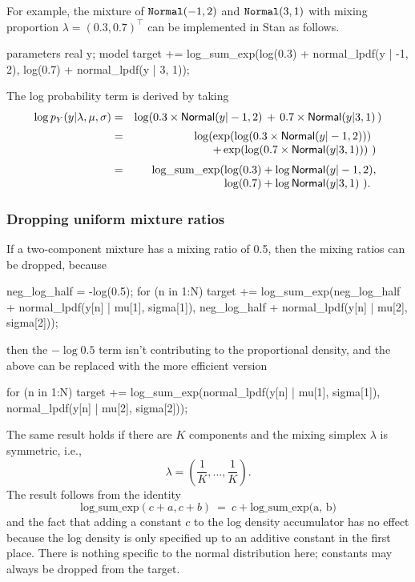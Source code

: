 For example, the mixture of ${\tt Normal}(-1,2)$ and
${\tt Normal}(3,1)$ with mixing proportion $\lambda =
(0.3,0.7)^{\top}$ can be implemented in Stan as follows.
%
\begin{stancode}
parameters {
  real y;
}
model {
  target += log_sum_exp(log(0.3) + normal_lpdf(y | -1, 2),
                        log(0.7) + normal_lpdf(y | 3, 1));
}
\end{stancode}
%
The log probability term is derived by taking
%
\begin{eqnarray*}
\log p_Y(y | \lambda,\mu,\sigma) & = & \log\!\left( 0.3 \times \mbox{\sf Normal}(y|-1,2) \, + \,
  0.7 \times
  \mbox{\sf Normal}(y|3,1) \, \right)
\\[2pt]
& = & \log(\hspace*{-5pt} \begin{array}[t]{l}
                 \exp(\log(0.3 \times \mbox{\sf Normal}(y|-1,2))) \\
                 + \exp(\log(0.7 \times \mbox{\sf Normal}(y|3,1))) \ )
              \end{array}
\\[2pt]
& = & \mbox{log\_sum\_exp}(\hspace*{-5pt}\begin{array}[t]{l}
                         \log(0.3) + \log \mbox{\sf Normal}(y|-1,2),
                         \\
                         \log(0.7) + \log \mbox{\sf Normal}(y|3,1) \ ).
                       \end{array}
\end{eqnarray*}
%

\subsubsection{Dropping uniform mixture ratios}

If a two-component mixture has a mixing ratio of 0.5, then the mixing
ratios can be dropped, because
%
\begin{stancode}
neg_log_half = -log(0.5);
for (n in 1:N)
  target
    += log_sum_exp(neg_log_half + normal_lpdf(y[n] | mu[1], sigma[1]),
                   neg_log_half + normal_lpdf(y[n] | mu[2], sigma[2]));
\end{stancode}
%
then the $-\log 0.5$ term isn't contributing to the proportional
density, and the above can be replaced with the more efficient version
%
\begin{stancode}
for (n in 1:N)
  target += log_sum_exp(normal_lpdf(y[n] | mu[1], sigma[1]),
                        normal_lpdf(y[n] | mu[2], sigma[2]));
\end{stancode}
%
The same result holds if there are $K$ components and the mixing
simplex $\lambda$ is symmetric, i.e.,
%
\[
\lambda = \left( \frac{1}{K},   \ldots, \frac{1}{K} \right).
\]
%
The result follows from the identity
%
\[
\mbox{log\_sum\_exp}(c + a, c + b)
\ = \
c + \mbox{log\_sum\_exp(a, b)}
\]
%
and the fact that adding a constant $c$ to the log density accumulator
has no effect because the log density is only specified up to an
additive constant in the first place.  There is nothing specific to
the normal distribution here; constants may always be dropped from the
target.


